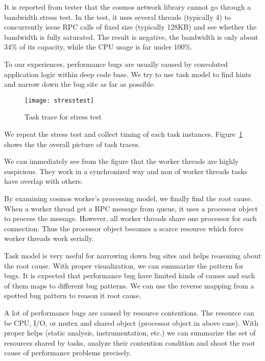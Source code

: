 It is reported from tester that the cosmos network library
cannot go through a bandwidth stress test. In the test, it
uses several threads (typically 4) to concurrently issue RPC
calls of fixed size (typically 128KB) and see whether the
bandwidth is fully saturated. The result is negative, the
bandwidth is only about 34\% of its capacity, while the
CPU usage is far under 100\%.

To our experiences, performance bugs are usually caused by
convoluted application logic within deep code base. We try
to use task model to find hints and narrow down the bug site
as far as possible.

\begin{figure}
\centering
\texttt{[image: stresstest]}
\caption{Task trace for stress test}
\label{fig:stresstest}
\end{figure}

We repeat the stress test and collect timing of each task
instances. Figure~\ref{fig:stresstest} shows the the overall
picture of task traces.

We can immediately see from the figure that the worker
threads are highly suspicious. They work in a synchronized
way and non of worker threads tasks have overlap with
others.

By examining cosmos worker's processing model, we finally
find the root cause. When a worker thread get a RPC message
from queue, it uses a processor object to process the
message. However, all worker threads share one processor for
each connection. Thus the processor object becomes a scarce
resource which force worker threads work serially.

\lesson Task model is very useful for narrowing down bug
sites and helps reasoning about the root cause. With proper
visualization, we can summarize the pattern for bugs. It is
expected that performance bug have limited kinds of causes
and each of them maps to different bug patterns. We can use
the reverse mapping from a spotted bug pattern to reason it
root cause.

A lot of performance bugs are caused by resource
contentions. The resource can be CPU, I/O, or mutex and
shared object (processor object in above case). With proper
helps (static analysis, instrumentation, etc.) we can
summarize the set of resources shared by tasks, analyze
their contention condition and shoot the root cause of
performance problems precisely.

